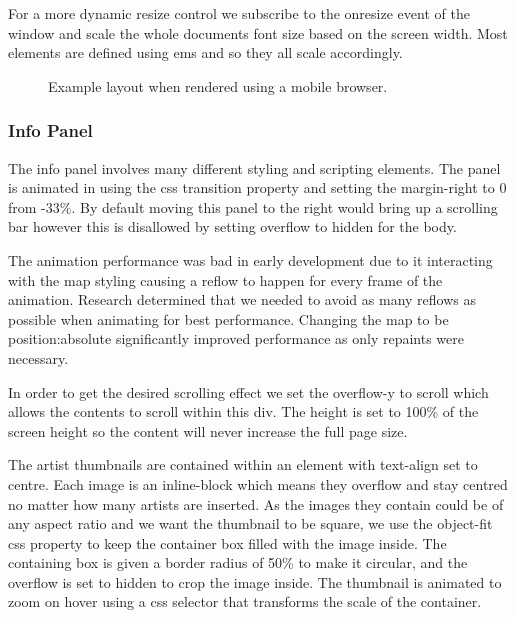 \documentclass[10pt]{article}
\begin{document}
                For a more dynamic resize control we subscribe to the onresize event of the window and scale the whole documents font size based on the screen width. Most elements are defined using ems and so they all scale accordingly.
                \begin{figure}[!ht]
                  \centering
                  \caption{Example layout when rendered using a mobile browser.}
                \end{figure}

            \subsubsection{Info Panel}
                The info panel involves many different styling and scripting elements. The panel is animated in using the css transition property and setting the margin-right to 0 from -33\%. By default moving this panel to the right would bring up a scrolling bar however this is disallowed by setting overflow to hidden for the body.

                The animation performance was bad in early development due to it interacting with the map styling causing a reflow to happen for every frame of the animation. Research determined that we needed to avoid as many reflows as possible when animating for best performance. Changing the map to be position:absolute significantly improved performance as only repaints were necessary.

                In order to get the desired scrolling effect we set the overflow-y to scroll which allows the contents to scroll within this div. The height is set to 100\% of the screen height so the content will never increase the full page size.

                The artist thumbnails are contained within an element with text-align set to centre. Each image is an inline-block which means they overflow and stay centred no matter how many artists are inserted. As the images they contain could be of any aspect ratio and we want the thumbnail to be square, we use the object-fit css property to keep the container box filled with the image inside. The containing box is given a border radius of 50\% to make it circular, and the overflow is set to hidden to crop the image inside. The thumbnail is animated to zoom on hover using a css selector that transforms the scale of the container.
\end{document}
